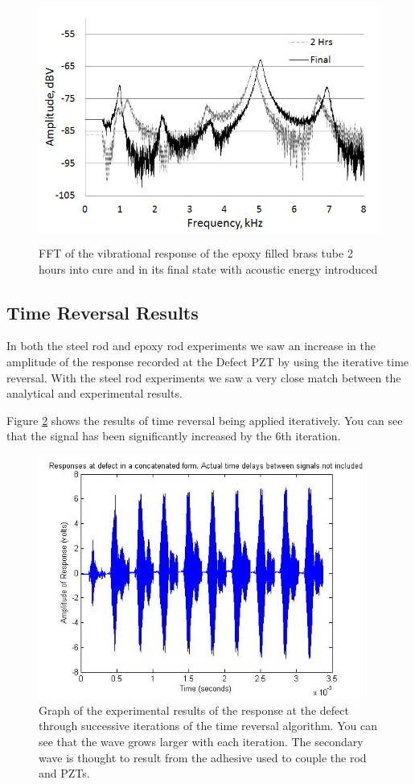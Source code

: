 \documentclass[]{aiaa-tc}%
\begin{document}
\begin{figure}[H]%
\centering
 \includegraphics[height = 8cm]{epoxy_fft_sound}
 \caption{FFT of the vibrational response of the epoxy filled brass tube 2 hours into cure and in its final state with acoustic energy introduced}
 \label{fig:epoxy_fft_sound}
\end{figure}

\subsection{Time Reversal Results}

In both the steel rod and epoxy rod experiments we saw an increase in the amplitude of the response recorded at the Defect PZT by using the iterative time reversal. With the steel rod experiments we saw a very close match between the analytical and experimental results.  

Figure \ref{fig:tr_steel2} shows the results of time reversal being applied iteratively. You can see that the signal has been significantly increased by the 6th iteration. 

\begin{figure}[H]%
\centering
 \includegraphics[height = 8cm]{tr_steel_rod_results}
 \caption{Graph of the experimental results of the response at the defect through successive iterations of the time reversal algorithm. You can see that the wave grows larger with each iteration. The secondary wave is thought to result from the adhesive used to couple the rod and PZTs.}
 \label{fig:tr_steel2}
\end{figure}
\end{document}
